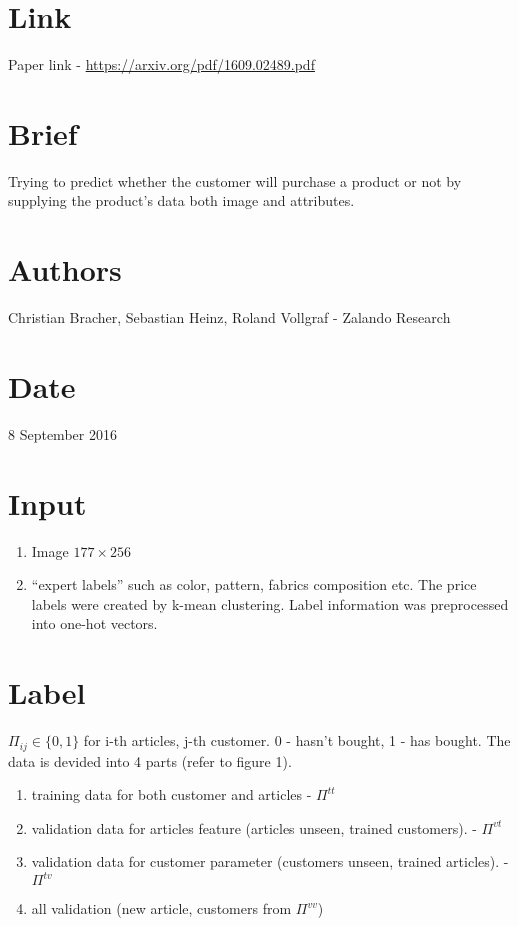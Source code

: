 \documentclass{article}
\begin{document}
\section*{Link}
Paper link - \url{https://arxiv.org/pdf/1609.02489.pdf}
\section*{Brief}
Trying to predict whether the customer will purchase a product or not by supplying the product's data both image and attributes.
\section*{Authors}
Christian Bracher, Sebastian Heinz, Roland Vollgraf - Zalando Research
\section*{Date}
8 September 2016
\section*{Input}
\begin{enumerate}
\item Image $177\times256$
\item ``expert labels'' such as color, pattern, fabrics composition etc. The price labels were created by k-mean clustering. Label information was preprocessed into one-hot vectors.
\end{enumerate}
\section*{Label}
$\Pi_{ij} \in \{0,1\}$ for i-th articles, j-th customer. 0 - hasn't bought, 1 - has bought. The data is devided into 4 parts (refer to figure 1).
\begin{enumerate}
\item training data for both customer and articles - $\Pi^{tt}$
\item validation data for articles feature (articles unseen, trained customers). - $\Pi^{vt}$
\item validation data for customer parameter (customers unseen, trained articles). - $\Pi^{tv}$
\item all validation (new article, customers from $\Pi^{vv}$)
\end{enumerate}
\end{document}
